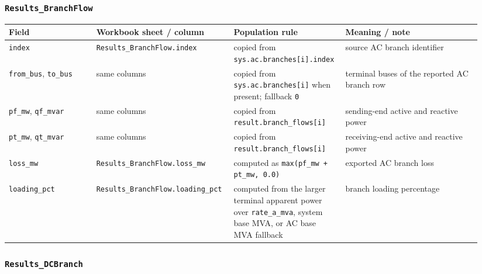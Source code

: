 \subsubsection*{\texttt{Results\_BranchFlow}}

\begin{longtable}{@{}L{0.18\linewidth}L{0.26\linewidth}L{0.22\linewidth}L{0.28\linewidth}@{}}
\toprule
Field & Workbook sheet / column & Population rule & Meaning / note \\
\midrule
\endhead
\texttt{index} & \texttt{Results\_BranchFlow.index} & copied from \texttt{sys.ac.branches[i].index} & source AC branch identifier \\
\texttt{from\_bus}, \texttt{to\_bus} & same columns & copied from \texttt{sys.ac.branches[i]} when present; fallback \texttt{0} & terminal buses of the reported AC branch row \\
\texttt{pf\_mw}, \texttt{qf\_mvar} & same columns & copied from \texttt{result.branch\_flows[i]} & sending-end active and reactive power \\
\texttt{pt\_mw}, \texttt{qt\_mvar} & same columns & copied from \texttt{result.branch\_flows[i]} & receiving-end active and reactive power \\
\texttt{loss\_mw} & \texttt{Results\_BranchFlow.loss\_mw} & computed as \texttt{max(pf\_mw + pt\_mw, 0.0)} & exported AC branch loss \\
\texttt{loading\_pct} & \texttt{Results\_BranchFlow.loading\_pct} & computed from the larger terminal apparent power over \texttt{rate\_a\_mva}, system base MVA, or AC base MVA fallback & branch loading percentage \\
\bottomrule
\end{longtable}

\subsubsection*{\texttt{Results\_DCBranch}}

